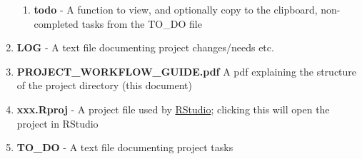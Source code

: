 \documentclass{article}\usepackage[]{graphicx}\usepackage[]{color}
\begin{document}
\begin{enumerate}
\begin{enumerate}
     \item \textbf{todo} - A function to view, and optionally copy to the clipboard, non-completed tasks from the TO\_DO file
  \end{enumerate}   
  \item \textbf{LOG} - A text file documenting project changes/needs etc.
  \item \textbf{PROJECT\_WORKFLOW\_GUIDE.pdf} A pdf explaining the structure of the project directory (this document)  
  \item \textbf{xxx.Rproj} - A project file used by \href{http://www.rstudio.com/}{RStudio}; clicking this will open the project in RStudio
  \item \textbf{TO\_DO} - A text file documenting project tasks 
\end{enumerate}
\end{document}
